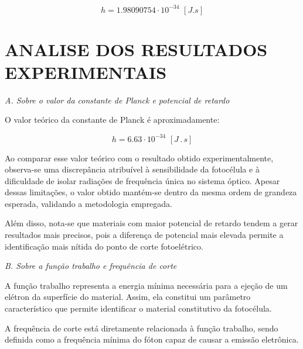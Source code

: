 \documentclass[10pt,twocolumn,letterpaper]{article}
\begin{document}
\begin{equation*}
    h = 1.98090754\cdot 10^{-34} \,\, [J.s]
\end{equation*}


\section{ANALISE DOS RESULTADOS EXPERIMENTAIS}

\noindent\textit{A. Sobre o valor da constante de Planck e potencial de
retardo}

\noindent O valor teórico da constante de Planck é aproximadamente:

\vspace{-.3cm}

\begin{equation*}
    h = 6.63 \cdot 10^{-34} \,\, [J\,.\,s]
\end{equation*}

\vspace{-.22cm}

\hspace{1cm} Ao comparar esse valor teórico com o resultado obtido experimentalmente, observa-se uma discrepância atribuível à sensibilidade da fotocélula e à dificuldade de isolar radiações de frequência única no sistema óptico. Apesar dessas limitações, o valor obtido mantém-se dentro da mesma ordem de grandeza esperada, validando a metodologia empregada.

\hspace{1cm} Além disso, nota-se que materiais com maior potencial de retardo tendem a gerar resultados mais precisos, pois a diferença de potencial mais elevada permite a identificação mais nítida do ponto de corte fotoelétrico.

\noindent\textit{B. Sobre a função trabalho e frequência de corte}

\hspace{1cm} A função trabalho representa a energia mínima necessária para a ejeção de um elétron da superfície do material. Assim, ela constitui um parâmetro característico que permite identificar o material constitutivo da fotocélula.

\hspace{1cm} A frequência de corte está diretamente relacionada à função trabalho, sendo definida como a frequência mínima do fóton capaz de causar a emissão eletrônica.
\end{document}
